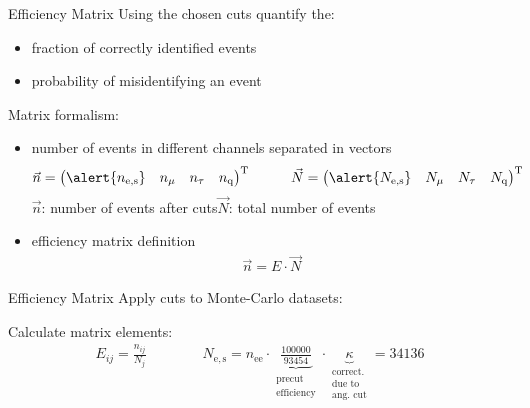 \documentclass[11pt,xcolor=dvipsnames,professionalfonts]{beamer}
\begin{document}

\begin{frame}{Efficiency Matrix}
	Using the chosen cuts quantify the:
	\begin{itemize}
		\setlength\itemsep{1.em}
		\item fraction of correctly identified events
		\item probability of misidentifying an event
	\end{itemize}
	\vspace{0.7cm}
	\pause
	Matrix formalism:
	\begin{itemize}
		\setlength\itemsep{1.em}
		\item number of events in different channels separated in vectors
		\begin{align*}
			&\vec{n} = \begin{pmatrix}
			\alert{n_\mathrm{e,s}} & n_\mathrm{\mu} & n_\mathrm{\tau} & n_\mathrm{q}
			\end{pmatrix}^\mathrm{T}
			\qquad
			&\vec{N} = \begin{pmatrix}
			\alert{N_\mathrm{e,s}} & N_\mathrm{\mu} & N_\mathrm{\tau} & N_\mathrm{q}
			\end{pmatrix}^\mathrm{T}
		\end{align*}
		$\vec{n}$: number of events after cuts\qquad $\vec{N}$: total number of events 
		
		\item efficiency matrix definition
		\begin{align*}
			\vec{n} = E \cdot \vec{N}
		\end{align*}
		
		
	\end{itemize}
\end{frame}


\begin{frame}{Efficiency Matrix}
	Apply cuts to Monte-Carlo datasets:
	\begin{center}
		
	\end{center}
	\vspace{0.4cm}
	\pause
	Calculate matrix elements:
	\begin{align*}
		E_{ij} = \frac{n_{ij}}{N_j} \qquad\qquad N_\mathrm{e,s} = n_\mathrm{ee} \cdot \underbrace{\frac{100000}{93454}}_{\substack{\text{precut}\\\text{efficiency}}} \cdot \underbrace{\kappa}_{\substack{\text{correct.} \\ \text{due to} \\ \text{ang.\ cut}}} = 34136
	\end{align*}
\end{frame}
\end{document}
